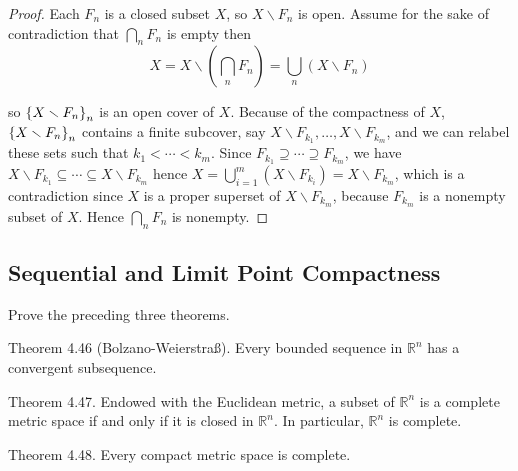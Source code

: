 \begin{proof}
	Each $F_{n}$ is a closed subset $X$, so $X\smallsetminus F_{n}$ is open. Assume for the sake of contradiction that $\bigcap_{n}F_{n}$ is empty then
	\begin{equation*}
		X = X\smallsetminus \left(\bigcap_{n}F_{n}\right) = \bigcup_{n}(X\smallsetminus F_{n})
	\end{equation*}

	so $\left\{{X\smallsetminus F_{n}}\right\}_{n}$ is an open cover of $X$. Because of the compactness of $X$, $\left\{{X\smallsetminus F_{n}}\right\}_{n}$ contains a finite subcover, say $X\smallsetminus F_{k_{1}}, \ldots, X\smallsetminus F_{k_{m}}$, and we can relabel these sets such that $k_{1} < \cdots < k_{m}$. Since $F_{k_{1}} \supseteq \cdots \supseteq F_{k_{m}}$, we have $X\smallsetminus F_{k_{1}} \subseteq \cdots \subseteq X\smallsetminus F_{k_{m}}$ hence $X = \bigcup^{m}_{i=1}(X\smallsetminus F_{k_{i}}) = X \smallsetminus F_{k_{m}}$, which is a contradiction since $X$ is a proper superset of $X\smallsetminus F_{k_{m}}$, because $F_{k_{m}}$ is a nonempty subset of $X$. Hence $\bigcap_{n}F_{n}$ is nonempty.
\end{proof}

\subsection*{Sequential and Limit Point Compactness}

\begin{exercise}{4.49}
	Prove the preceding three theorems.

	Theorem 4.46 (Bolzano-Weierstraß). Every bounded sequence in $\mathbb{R}^{n}$ has a convergent subsequence.

	Theorem 4.47. Endowed with the Euclidean metric, a subset of $\mathbb{R}^{n}$ is a complete metric space if and only if it is closed in $\mathbb{R}^{n}$. In particular, $\mathbb{R}^{n}$ is complete.

	Theorem 4.48. Every compact metric space is complete.
\end{exercise}

